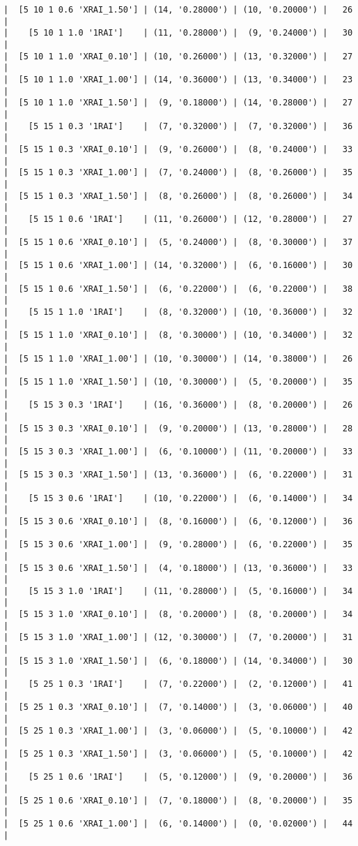 \documentclass{article}
\begin{document}
\begin{verbatim}
|  [5 10 1 0.6 'XRAI_1.50'] | (14, '0.28000') | (10, '0.20000') |   26  |
|    [5 10 1 1.0 '1RAI']    | (11, '0.28000') |  (9, '0.24000') |   30  |
|  [5 10 1 1.0 'XRAI_0.10'] | (10, '0.26000') | (13, '0.32000') |   27  |
|  [5 10 1 1.0 'XRAI_1.00'] | (14, '0.36000') | (13, '0.34000') |   23  |
|  [5 10 1 1.0 'XRAI_1.50'] |  (9, '0.18000') | (14, '0.28000') |   27  |
|    [5 15 1 0.3 '1RAI']    |  (7, '0.32000') |  (7, '0.32000') |   36  |
|  [5 15 1 0.3 'XRAI_0.10'] |  (9, '0.26000') |  (8, '0.24000') |   33  |
|  [5 15 1 0.3 'XRAI_1.00'] |  (7, '0.24000') |  (8, '0.26000') |   35  |
|  [5 15 1 0.3 'XRAI_1.50'] |  (8, '0.26000') |  (8, '0.26000') |   34  |
|    [5 15 1 0.6 '1RAI']    | (11, '0.26000') | (12, '0.28000') |   27  |
|  [5 15 1 0.6 'XRAI_0.10'] |  (5, '0.24000') |  (8, '0.30000') |   37  |
|  [5 15 1 0.6 'XRAI_1.00'] | (14, '0.32000') |  (6, '0.16000') |   30  |
|  [5 15 1 0.6 'XRAI_1.50'] |  (6, '0.22000') |  (6, '0.22000') |   38  |
|    [5 15 1 1.0 '1RAI']    |  (8, '0.32000') | (10, '0.36000') |   32  |
|  [5 15 1 1.0 'XRAI_0.10'] |  (8, '0.30000') | (10, '0.34000') |   32  |
|  [5 15 1 1.0 'XRAI_1.00'] | (10, '0.30000') | (14, '0.38000') |   26  |
|  [5 15 1 1.0 'XRAI_1.50'] | (10, '0.30000') |  (5, '0.20000') |   35  |
|    [5 15 3 0.3 '1RAI']    | (16, '0.36000') |  (8, '0.20000') |   26  |
|  [5 15 3 0.3 'XRAI_0.10'] |  (9, '0.20000') | (13, '0.28000') |   28  |
|  [5 15 3 0.3 'XRAI_1.00'] |  (6, '0.10000') | (11, '0.20000') |   33  |
|  [5 15 3 0.3 'XRAI_1.50'] | (13, '0.36000') |  (6, '0.22000') |   31  |
|    [5 15 3 0.6 '1RAI']    | (10, '0.22000') |  (6, '0.14000') |   34  |
|  [5 15 3 0.6 'XRAI_0.10'] |  (8, '0.16000') |  (6, '0.12000') |   36  |
|  [5 15 3 0.6 'XRAI_1.00'] |  (9, '0.28000') |  (6, '0.22000') |   35  |
|  [5 15 3 0.6 'XRAI_1.50'] |  (4, '0.18000') | (13, '0.36000') |   33  |
|    [5 15 3 1.0 '1RAI']    | (11, '0.28000') |  (5, '0.16000') |   34  |
|  [5 15 3 1.0 'XRAI_0.10'] |  (8, '0.20000') |  (8, '0.20000') |   34  |
|  [5 15 3 1.0 'XRAI_1.00'] | (12, '0.30000') |  (7, '0.20000') |   31  |
|  [5 15 3 1.0 'XRAI_1.50'] |  (6, '0.18000') | (14, '0.34000') |   30  |
|    [5 25 1 0.3 '1RAI']    |  (7, '0.22000') |  (2, '0.12000') |   41  |
|  [5 25 1 0.3 'XRAI_0.10'] |  (7, '0.14000') |  (3, '0.06000') |   40  |
|  [5 25 1 0.3 'XRAI_1.00'] |  (3, '0.06000') |  (5, '0.10000') |   42  |
|  [5 25 1 0.3 'XRAI_1.50'] |  (3, '0.06000') |  (5, '0.10000') |   42  |
|    [5 25 1 0.6 '1RAI']    |  (5, '0.12000') |  (9, '0.20000') |   36  |
|  [5 25 1 0.6 'XRAI_0.10'] |  (7, '0.18000') |  (8, '0.20000') |   35  |
|  [5 25 1 0.6 'XRAI_1.00'] |  (6, '0.14000') |  (0, '0.02000') |   44  |

\end{verbatim}
\end{document}
